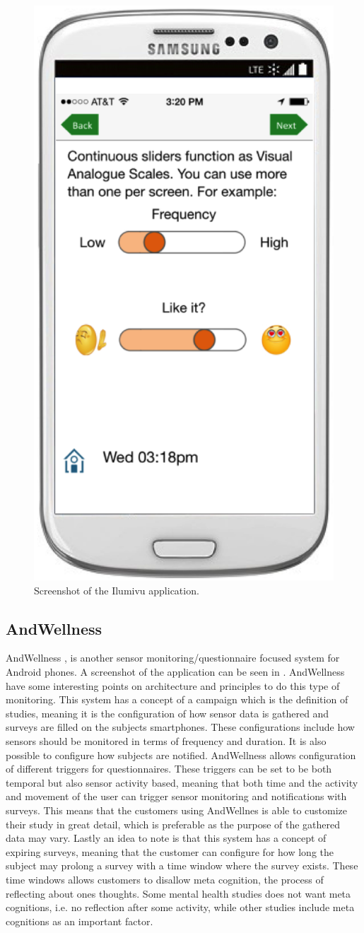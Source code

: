 \begin{figure}[!htbp]
	\centering
	\includegraphics[height=0.5\textwidth]{graphic/existing_solutions/ilumivu.png}
	\caption[]{Screenshot of the Ilumivu application\parencite{lumivu}.}
	\label{fig:ilumivu_screenshot}
\end{figure}
\FloatBarrier

\subsection{AndWellness}
\label{sub:andwellness}
AndWellness \parencite{hicks2010andwellness}, is another sensor monitoring/questionnaire focused system for Android phones. A screenshot of the application can be seen in . AndWellness have some interesting points on architecture and principles to do this type of monitoring. This system has a concept of a campaign which is the definition of studies, meaning it is the configuration of how sensor data is gathered and surveys are filled on the subjects smartphones. These configurations include how sensors should be monitored in terms of frequency and duration. It is also possible to configure how subjects are notified. AndWellness allows configuration of different triggers for questionnaires. These triggers can be set to be both temporal but also sensor activity based, meaning that both time and the activity and movement of the user can trigger sensor monitoring and notifications with surveys. This means that the customers using AndWellnes is able to customize their study in great detail, which is preferable as the purpose of the gathered data may vary. Lastly an idea to note is that this system has a concept of expiring surveys, meaning that the customer can configure for how long the subject may prolong a survey with a time window where the survey exists. These time windows allows customers to disallow meta cognition, the process of reflecting about ones thoughts. Some mental health studies does not want meta cognitions, i.e. no reflection after some activity, while other studies include meta cognitions as an important factor. 


